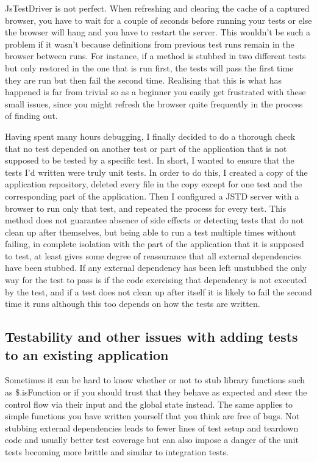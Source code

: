 \documentclass[11pt]{article}
\begin{document}
JsTestDriver is not perfect. When refreshing and clearing the cache of a captured browser, you have to wait for a couple of seconds before running your tests or else the browser will hang and you have to restart the server. This wouldn't be such a problem if it wasn't because definitions from previous test runs remain in the browser between runs. For instance, if a method is stubbed in two different tests but only restored in the one that is run first, the tests will pass the first time they are run but then fail the second time. Realising that this is what has happened is far from trivial so as a beginner you easily get frustrated with these small issues, since you might refresh the browser quite frequently in the process of finding out.

Having spent many hours debugging, I finally decided to do a thorough check that no test depended on another test or part of the application that is not supposed to be tested by a specific test. In short, I wanted to ensure that the tests I'd written were truly unit tests. In order to do this, I created a copy of the application repository, deleted every file in the copy except for one test and the corresponding part of the application. Then I configured a JSTD server with a browser to run only that test, and repeated the process for every test. This method does not guarantee absence of side effects or detecting tests that do not clean up after themselves, but being able to run a test multiple times without failing, in complete isolation with the part of the application that it is supposed to test, at least gives some degree of reassurance that all external dependencies have been stubbed. If any external dependency has been left unstubbed the only way for the test to pass is if the code exercising that dependency is not executed by the test, and if a test does not clean up after itself it is likely to fail the second time it runs although this too depends on how the tests are written.

\subsection{Testability and other issues with adding tests to an existing application}

Sometimes it can be hard to know whether or not to stub library functions such as \$.isFunction or if you should trust that they behave as expected and steer the control flow via their input and the global state instead. The same applies to simple functions you have written yourself that you think are free of bugs. Not stubbing external dependencies leads to fewer lines of test setup and teardown code and usually better test coverage but can also impose a danger of the unit tests becoming more brittle and similar to integration tests.
\end{document}
